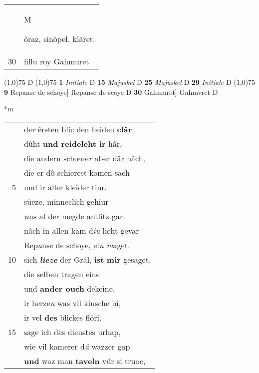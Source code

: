 \documentclass[8pt,a4paper,notitlepage]{article}
\begin{document}
\begin{table}[ht]
\begin{minipage}[t]{0.5\linewidth}
\begin{tabular}{rl}
 & \begin{large}M\end{large}ôraz, sinôpel, klâret.\\ 
30 & fillu roy Gahmuret\\ 
\end{tabular}
\scriptsize
\line(1,0){75} \newline
D \newline
\line(1,0){75} \newline
\textbf{1} \textit{Initiale} D  \textbf{15} \textit{Majuskel} D  \textbf{25} \textit{Majuskel} D  \textbf{29} \textit{Initiale} D  \newline
\line(1,0){75} \newline
\textbf{9} Repanse de schoye] Repanse de scoye D \textbf{30} Gahmuret] Gahmvret D \newline
\end{minipage}
\hspace{0.5cm}
\begin{minipage}[t]{0.5\linewidth}
\small
\begin{center}*m
\end{center}
\begin{tabular}{rl}
 & de\textit{r} êrsten blic den heiden \textbf{clâr}\\ 
 & dûht \textbf{und reideleht ir} hâr,\\ 
 & die andern schœne\textit{r} aber dâr nâch,\\ 
 & die er dô schierest komen sach\\ 
5 & und ir aller kleider tiur.\\ 
 & süeze, minneclîch gehiur\\ 
 & was al der megde antlitz gar.\\ 
 & nâch in allen kam d\textit{iu} lieht gevar\\ 
 & Rep\textit{a}nse de schoye, ei\textit{n m}aget.\\ 
10 & sich \textit{\textbf{lieze}} der Grâl, \textbf{ist} \textbf{mir} gesaget,\\ 
 & die selben tragen eine\\ 
 & und \textbf{ander ouch} dekeine.\\ 
 & ir herze\textit{n} was vil kiusche bî,\\ 
 & ir vel \textbf{des} blickes flôrî.\\ 
15 & sage ich des dienstes urhap,\\ 
 & wie vil kamerer d\textit{â} wazzer gap\\ 
 & \textbf{und} waz man \textbf{taveln} vür si truoc,\\ 

\end{tabular}
\end{minipage}
\end{table}
\end{document}
